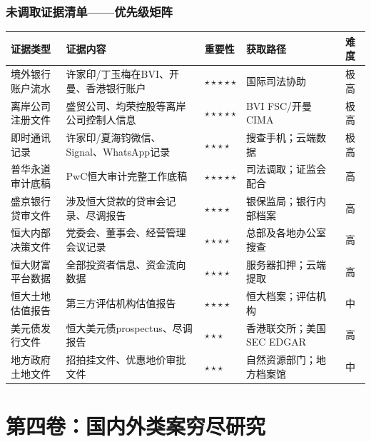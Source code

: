 \documentclass[11pt,a4paper,oneside,openany]{article}
\begin{document}
\section{未调取证据清单——优先级矩阵}
\begin{threeparttable}
\caption{未调取关键证据优先级矩阵}
\begin{tabular}{p{3cm}p{4cm}p{1.3cm}p{3cm}p{1.5cm}}
\toprule
\textbf{证据类型} & \textbf{证据内容} & \textbf{重要性} & \textbf{获取路径} & \textbf{难度} \\
\midrule
境外银行账户流水 & 许家印/丁玉梅在BVI、开曼、香港银行账户 & $\star\star\star\star\star$ & 国际司法协助 & 极高 \\
离岸公司注册文件 & 盛贸公司、均荣控股等离岸公司控制人信息 & $\star\star\star\star\star$ & BVI FSC/开曼CIMA & 极高 \\
即时通讯记录 & 许家印/夏海钧微信、Signal、WhatsApp记录 & $\star\star\star\star$ & 搜查手机；云端数据 & 极高 \\
普华永道审计底稿 & PwC恒大审计完整工作底稿 & $\star\star\star\star\star$ & 司法调取；证监会配合 & 高 \\
盛京银行贷审文件 & 涉及恒大贷款的贷审会记录、尽调报告 & $\star\star\star\star$ & 银保监局；银行内部档案 & 高 \\
恒大内部决策文件 & 党委会、董事会、经营管理会议记录 & $\star\star\star\star$ & 总部及各地办公室搜查 & 高 \\
恒大财富平台数据 & 全部投资者信息、资金流向数据 & $\star\star\star\star$ & 服务器扣押；云端提取 & 高 \\
恒大土地估值报告 & 第三方评估机构估值报告 & $\star\star\star\star$ & 恒大档案；评估机构 & 中 \\
美元债发行文件 & 恒大美元债prospectus、尽调报告 & $\star\star\star$ & 香港联交所；美国SEC EDGAR & 高 \\
地方政府土地文件 & 招拍挂文件、优惠地价审批文件 & $\star\star\star$ & 自然资源部门；地方档案馆 & 中 \\
\bottomrule
\end{tabular}
\end{threeparttable}

\newpage
\part{第四卷：国内外类案穷尽研究}
\end{document}
